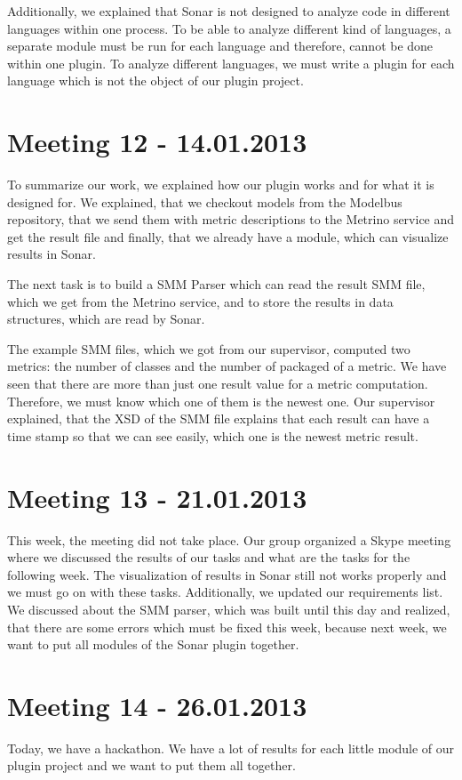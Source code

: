 Additionally, we explained that Sonar is not designed to analyze code in different languages within one process. To be able to analyze different kind of languages, a separate module must be run for each language and therefore, cannot be done within one plugin. To analyze different languages, we must write a plugin for each language which is not the object of our plugin project.

\section{Meeting 12 - 14.01.2013}
To summarize our work, we explained how our plugin works and for what it is designed for. We explained, that we checkout models from the Modelbus repository, that we send them with metric descriptions to the Metrino service and get the result file and finally, that we already have a module, which can visualize results in Sonar.

The next task is to build a SMM Parser which can read the result SMM file, which we get from the Metrino service, and to store the results in data structures, which are read by Sonar.

The example SMM files, which we got from our supervisor, computed two metrics: the number of classes and the number of packaged of a metric. We have seen that there are more than just one result value for a metric computation. Therefore, we must know which one of them is the newest one. Our supervisor explained, that the XSD of the SMM file explains that each result can have a time stamp so that we can see easily, which one is the newest metric result.

\section{Meeting 13 - 21.01.2013}
This week, the meeting did not take place. Our group organized a Skype meeting where we discussed the results of our tasks and what are the tasks for the following week. The visualization of results in Sonar still not works properly and we must go on with these tasks. Additionally, we updated our requirements list. We discussed about the SMM parser, which was built until this day and realized, that there are some errors which must be fixed this week, because next week, we want to put all modules of the Sonar plugin together.

\section{Meeting 14 - 26.01.2013}
Today, we have a hackathon. We have a lot of results for each little module of our plugin project and we want to put them all together.

